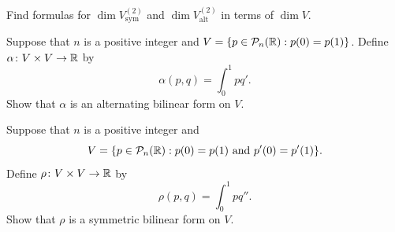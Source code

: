 \begin{exc}
\begin{exercise}
Find formulas for $\dim V_{\mathrm{sym}}^{(2)}$ and
$\dim V_{\mathrm{alt}}^{(2)}$ in terms of $\dim V$.
\end{exercise}

\begin{exercise}
Suppose that $n$ is a positive integer and
$V=\{p\in\mathcal{P}_n(\mathbb{R}) : p(0)=p(1)\}$. Define $\alpha\colon V\times V\to\mathbb{R}$ by
\[ \alpha(p,q) = \int_0^1 pq'. \]
Show that $\alpha$ is an alternating bilinear form on $V$.
\end{exercise}

\begin{exercise}
Suppose that $n$ is a positive integer and
\[ V = \{p\in\mathcal{P}_n(\mathbb{R}) : p(0)=p(1) \text{ and } p'(0)=p'(1)\}. \]
Define $\rho\colon V\times V\to\mathbb{R}$ by
\[ \rho(p,q) = \int_0^1 pq''. \]
Show that $\rho$ is a symmetric bilinear form on $V$.
\end{exercise}
\end{exc}
